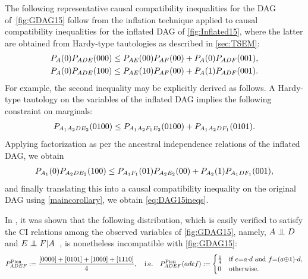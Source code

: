 {The following representative causal compatibility inequalities for the DAG of~\cref{fig:GDAG15} follow from the inflation technique applied to causal compatibility inequalities for the inflated DAG of \cref{fig:Inflated15}, where the latter are obtained from Hardy-type tautologies as described in \cref{sec:TSEM}:
\begin{align}
\p[A]{0} \p[A D E]{0 0 0} \leq {\p[A E]{0 0} \p[A F]{0 0}  + \p[A]{0} \p[A D F]{0 0 1}}, \\
\p[A]{0}\p[A D E]{1 0 0} \leq {\p[A E]{1 0} \p[A F]{0 0} + \p[A]{1} \p[A D F]{0 0 1}}.
\label{eq:DAG15ineqs}
\end{align}
For example, the second inequality may be explicitly derived as follows. A Hardy-type tautology on the variables of the inflated DAG implies the following constraint on marginals:
\begin{align}\label{eq:hardyforpienaar}
     \pdf[A_1 A_2 D E_2]{0100} \leq \pdf[A_1 A_2 F_1 E_2]{0100} + \pdf[A_1 A_2 D F_1]{0101} .
\end{align}
Applying factorization as per the ancestral independence relations of the inflated DAG, we obtain 
\begin{align}
 \p[A_1]{0} \p[A_2 D E_2]{100} \leq \p[A_1 F_1]{01} \p[A_2 E_2]{00} + \p[A_2]{1} \p[A_1 D F_1]{001},   
\end{align}
and finally translating this into a causal compatibility inequality on the original DAG using \cref{maincorollary}, we obtain \cref{eq:DAG15ineqs}. 
 
In \citet{pianaar2016interesting}, it was shown that the following distribution, which is easily verified to satisfy the CI relations among the observed variables of \cref{fig:GDAG15}, namely, $A\indep D$ and $E\indep F | A$~\cite{pusey2014gdag}, is nonetheless incompatible with \cref{fig:GDAG15}:
\begin{align}\label{eq:pienaardistro}
P^{\text{Pien}}_{A D E F}:=\frac{[0000]+[0101]+[1000]+[1110]}{4},\quad\text{i.e.}\quad P^{\text{Pien}}_{A D E F}(a d e f):=\begin{cases}\tfrac{1}{4}&\text{if }  e\eql a\cramp{\cdot} d \text{ and } f\eql  (a\cramp{\oplus} 1)\cramp{\cdot} d , \\ 0&\text{otherwise}.\end{cases}
\end{align}

}

